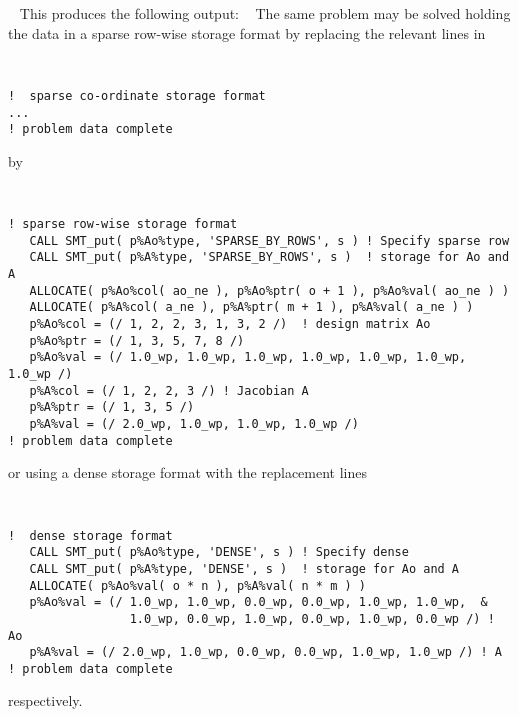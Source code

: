 \documentclass{galahad}
\begin{document}
{\tt \small
\VerbatimInput{\packageexample}
}
\noindent
This produces the following output:
{\tt \small
\VerbatimInput{\packageresults}
}
\noindent
The same problem may be solved holding the data in
a sparse row-wise storage format by replacing the relevant lines in
{\tt \small
\begin{verbatim}
!  sparse co-ordinate storage format
...
! problem data complete
\end{verbatim}
}
\noindent
by
{\tt \small
\begin{verbatim}
! sparse row-wise storage format
   CALL SMT_put( p%Ao%type, 'SPARSE_BY_ROWS', s ) ! Specify sparse row
   CALL SMT_put( p%A%type, 'SPARSE_BY_ROWS', s )  ! storage for Ao and A
   ALLOCATE( p%Ao%col( ao_ne ), p%Ao%ptr( o + 1 ), p%Ao%val( ao_ne ) )
   ALLOCATE( p%A%col( a_ne ), p%A%ptr( m + 1 ), p%A%val( a_ne ) )
   p%Ao%col = (/ 1, 2, 2, 3, 1, 3, 2 /)  ! design matrix Ao
   p%Ao%ptr = (/ 1, 3, 5, 7, 8 /)
   p%Ao%val = (/ 1.0_wp, 1.0_wp, 1.0_wp, 1.0_wp, 1.0_wp, 1.0_wp, 1.0_wp /)
   p%A%col = (/ 1, 2, 2, 3 /) ! Jacobian A
   p%A%ptr = (/ 1, 3, 5 /)
   p%A%val = (/ 2.0_wp, 1.0_wp, 1.0_wp, 1.0_wp /)
! problem data complete
\end{verbatim}
}
\noindent
or using a dense storage format with the replacement lines
{\tt \small
\begin{verbatim}
!  dense storage format
   CALL SMT_put( p%Ao%type, 'DENSE', s ) ! Specify dense
   CALL SMT_put( p%A%type, 'DENSE', s )  ! storage for Ao and A
   ALLOCATE( p%Ao%val( o * n ), p%A%val( n * m ) )
   p%Ao%val = (/ 1.0_wp, 1.0_wp, 0.0_wp, 0.0_wp, 1.0_wp, 1.0_wp,  &
                 1.0_wp, 0.0_wp, 1.0_wp, 0.0_wp, 1.0_wp, 0.0_wp /) ! Ao
   p%A%val = (/ 2.0_wp, 1.0_wp, 0.0_wp, 0.0_wp, 1.0_wp, 1.0_wp /) ! A
! problem data complete
\end{verbatim}
}
\noindent
respectively.
\end{document}
